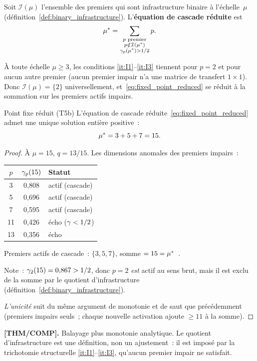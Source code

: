 \documentclass[12pt,a4paper]{article}
\begin{document}
\begin{definition}
\label{def:cascade_eq}
Soit $\mathcal{I}(\mu)$ l'ensemble des premiers qui sont
infrastructure binaire à l'échelle~$\mu$
(définition~\ref{def:binary_infrastructure}). L'\textbf{équation de
cascade réduite} est
\begin{equation}
  {\mu^{*}} = \sum_{\substack{p \text{ premier} \\
  p \notin \mathcal{I}({\mu^{*}}) \\
  \gamma_{p}({\mu^{*}}) > 1/2}} p.
  \label{eq:fixed_point_reduced}
\end{equation}
\end{definition}

À toute échelle $\mu \geq 3$, les conditions \ref{it:I1}--\ref{it:I3}
tiennent pour $p = 2$ et pour aucun autre premier (aucun premier
impair n'a une matrice de transfert $1 \times 1$). Donc
$\mathcal{I}(\mu) = \{2\}$ universellement,
et~\eqref{eq:fixed_point_reduced} se réduit à la sommation sur les
premiers actifs impairs.

\begin{thmbox}{Point fixe réduit (T5b)}
\label{thm:T5b}
\label{thm:T5} %
L'équation de cascade réduite~\eqref{eq:fixed_point_reduced} admet
une unique solution entière positive~:
\begin{equation}
  {\mu^{*}} = 3 + 5 + 7 = 15.
  \label{eq:mustar_15}
\end{equation}

\begin{proof}
À $\mu = 15$, $q = 13/15$. Les dimensions anomales des premiers
impairs~:
\begin{center}
\begin{tabular}{ccl}
\toprule
$p$ & $\gamma_{p}(15)$ & Statut \\
\midrule
3   & 0{,}808 & actif (cascade) \\
5   & 0{,}696 & actif (cascade) \\
7   & 0{,}595 & actif (cascade) \\
11  & 0{,}426 & écho ($\gamma_{} < 1/2$) \\
13  & 0{,}356 & écho \\
\bottomrule
\end{tabular}
\end{center}
Premiers actifs de cascade~: $\{3,5,7\}$, somme $= 15 = {\mu^{*}}$~\checkmark.

Note~: $\gamma_{2}(15) = 0{,}867 > 1/2$, donc $p = 2$ \emph{est} actif
au sens brut, mais il est exclu de la somme par le quotient
d'infrastructure (définition~\ref{def:binary_infrastructure}).

\emph{L'unicité} suit du même argument de monotonie et de saut que
précédemment (premiers impairs seuls~; chaque nouvelle activation
ajoute $\geq 11$ à la somme).
\end{proof}

\noindent\textbf{[THM/COMP].}\;
Balayage plus monotonie analytique. Le quotient d'infrastructure
est une définition, non un ajustement~: il est imposé par la
trichotomie structurelle \ref{it:I1}--\ref{it:I3}, qu'aucun premier
impair ne satisfait.
\end{thmbox}
\end{document}
